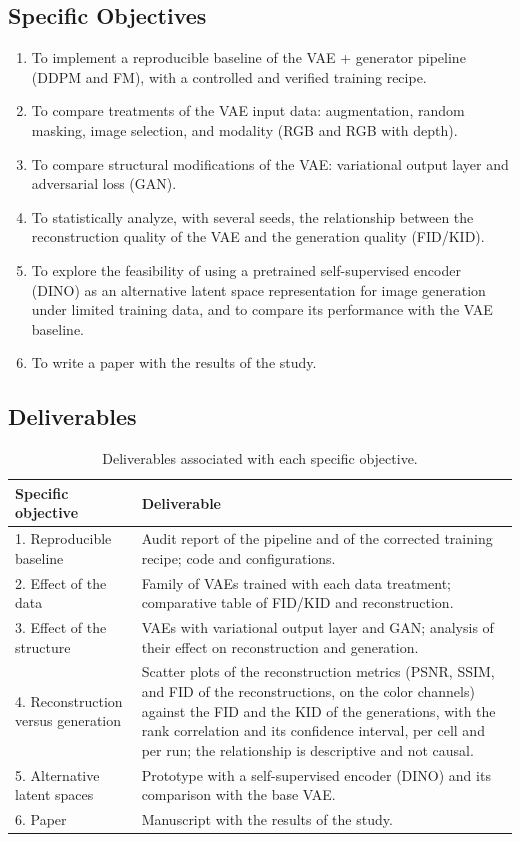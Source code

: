 \subsection{Specific Objectives}

\begin{enumerate}
  \item To implement a reproducible baseline of the VAE + generator pipeline (DDPM and FM), with a controlled and verified training recipe.
  \item To compare treatments of the VAE input data: augmentation, random masking, image selection, and modality (RGB and RGB with depth).
  \item To compare structural modifications of the VAE: variational output layer and adversarial loss (GAN).
  \item To statistically analyze, with several seeds, the relationship between the reconstruction quality of the VAE and the generation quality (FID/KID).
  \item To explore the feasibility of using a pretrained self-supervised encoder (DINO) as an alternative latent space representation for image generation under limited training data, and to compare its performance with the VAE baseline.
  \item To write a paper with the results of the study.
\end{enumerate}

\subsection{Deliverables}

\begin{table}[h]
\centering
\small
\begin{tabular}{p{}p{}}
\hline
\textbf{Specific objective} & \textbf{Deliverable} \\
\hline
1. Reproducible baseline & Audit report of the pipeline and of the corrected training recipe; code and configurations. \\
2. Effect of the data & Family of VAEs trained with each data treatment; comparative table of FID/KID and reconstruction. \\
3. Effect of the structure & VAEs with variational output layer and GAN; analysis of their effect on reconstruction and generation. \\
4. Reconstruction versus generation & Scatter plots of the reconstruction metrics (PSNR, SSIM, and FID of the reconstructions, on the color channels) against the FID and the KID of the generations, with the rank correlation and its confidence interval, per cell and per run; the relationship is descriptive and not causal. \\
5. Alternative latent spaces & Prototype with a self-supervised encoder (DINO) and its comparison with the base VAE. \\
6. Paper & Manuscript with the results of the study. \\
\hline
\end{tabular}
\caption{Deliverables associated with each specific objective.}
\end{table}


